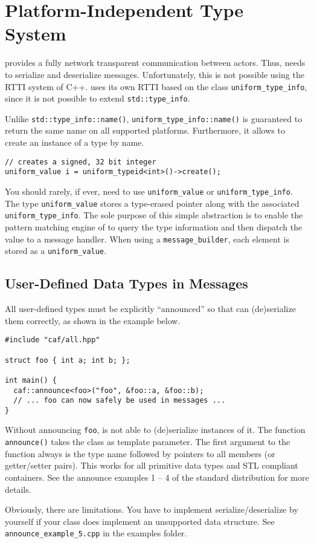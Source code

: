 \section{Platform-Independent Type System}
\label{Sec::TypeSystem}

\lib provides a fully network transparent communication between actors.
Thus, \lib needs to serialize and deserialize messages.
Unfortunately, this is not possible using the RTTI system of C++.
\lib uses its own RTTI based on the class \lstinline^uniform_type_info^, since it is not possible to extend \lstinline^std::type_info^.

Unlike \lstinline^std::type_info::name()^, \lstinline^uniform_type_info::name()^ is guaranteed to return the same name on all supported platforms. Furthermore, it allows to create an instance of a type by name.

\begin{lstlisting}
// creates a signed, 32 bit integer
uniform_value i = uniform_typeid<int>()->create();
\end{lstlisting}

You should rarely, if ever, need to use \lstinline^uniform_value^ or \lstinline^uniform_type_info^.
The type \lstinline^uniform_value^ stores a type-erased pointer along with the associated \lstinline^uniform_type_info^.
The sole purpose of this simple abstraction is to enable the pattern matching engine of \lib to query the type information and then dispatch the value to a message handler.
When using a \lstinline^message_builder^, each element is stored as a \lstinline^uniform_value^.

\subsection{User-Defined Data Types in Messages}
\label{Sec::TypeSystem::UserDefined}

All user-defined types must be explicitly ``announced'' so that \lib can (de)serialize them correctly, as shown in the example below.

\begin{lstlisting}
#include "caf/all.hpp"

struct foo { int a; int b; };

int main() {
  caf::announce<foo>("foo", &foo::a, &foo::b);
  // ... foo can now safely be used in messages ...
}
\end{lstlisting}

Without announcing \lstinline^foo^, \lib is not able to (de)serialize instances of it.
The function \lstinline^announce()^ takes the class as template parameter.
The first argument to the function always is the type name followed by pointers to all members (or getter/setter pairs).
This works for all primitive data types and STL compliant containers.
See the announce examples 1 -- 4 of the standard distribution for more details.

Obviously, there are limitations.
You have to implement serialize/deserialize by yourself if your class does implement an unsupported data structure.
See \lstinline^announce_example_5.cpp^ in the examples folder.
